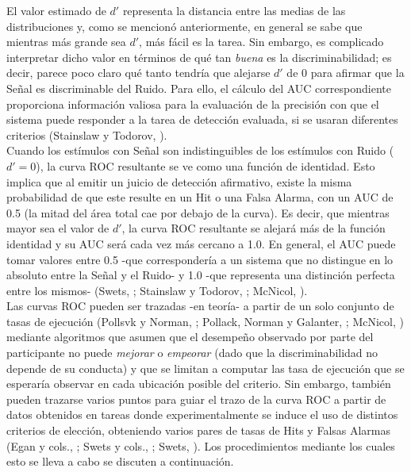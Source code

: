 El valor estimado de $d'$ representa la distancia entre las medias de las distribuciones y, como se mencionó anteriormente, en general se sabe que mientras más grande sea $d'$, más fácil es la tarea. Sin embargo, es complicado interpretar dicho valor en términos de qué tan \textit{buena} es la discriminabilidad; es decir, parece poco claro qué tanto tendría que alejarse $d'$ de $0$ para afirmar que la Señal es discriminable del Ruido. Para ello, el cálculo del AUC correspondiente proporciona información valiosa para la evaluación de la precisión con que el sistema puede responder a la tarea de detección evaluada, si se usaran diferentes criterios (Stainslaw y Todorov, \citeyear{Stainslaw1999}).\\ 

Cuando los estímulos con Señal son indistinguibles de los estímulos con Ruido ($d' = 0$), la curva ROC resultante se ve como una función de identidad. Esto implica que al emitir un juicio de detección afirmativo, existe la misma probabilidad de que este resulte en un Hit o una Falsa Alarma, con un AUC de 0.5 (la mitad del área total cae por debajo de la curva). Es decir, que mientras mayor sea el valor de $d'$, la curva ROC resultante se alejará más de la función identidad y su AUC será cada vez más cercano a 1.0. En general, el AUC puede tomar valores entre 0.5 -que correspondería a un sistema que no distingue en lo absoluto entre la Señal y el Ruido- y 1.0 -que representa una distinción perfecta entre los mismos- (Swets, \citeyear{Swets1973}; Stainslaw y Todorov, \citeyear{Stainslaw1999}; McNicol, \citeyear{McNicol5}).\\

Las curvas ROC pueden ser trazadas -en teoría- a partir de un solo conjunto de tasas de ejecución (Pollsvk y Norman, \citeyear{Pollack1964a}; Pollack, Norman y Galanter, \citeyear{Pollack1964b}; McNicol, \citeyear{McNicol2}) mediante algoritmos que asumen que el desempeño observado por parte del participante no puede \textit{mejorar} o \textit{empeorar} (dado que la discriminabilidad no depende de su conducta) y que se limitan a computar las tasa de ejecución que se esperaría observar en cada ubicación posible del criterio. Sin embargo, también pueden trazarse varios puntos para guiar el trazo de la curva ROC a partir de datos obtenidos en tareas donde experimentalmente se induce el uso de distintos criterios de elección, obteniendo varios pares de tasas de Hits y Falsas Alarmas (Egan y cols., \citeyear{Egan1959}; Swets y cols., \citeyear{Swets1961}; Swets, \citeyear{Swets1986}). Los procedimientos mediante los cuales esto se lleva a cabo se discuten a continuación.\\


